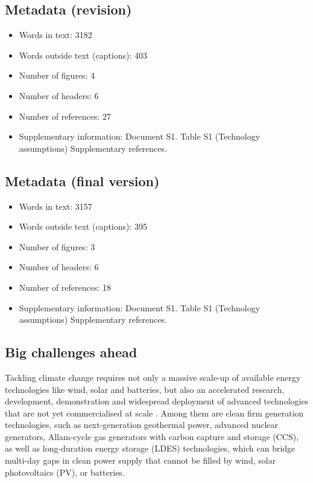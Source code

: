 \documentclass[pdflatex,sn-basic, Numbered]{sn-jnl}
\theoremstyle{thmstyleone}%
\theoremstyle{thmstyletwo}%
\theoremstyle{thmstylethree}%
\begin{document}
\subsection*{Metadata (revision)}
\begin{itemize}
    \item Words in text: 3182
    \item Words outside text (captions): 403
    \item Number of figures: 4
    \item Number of headers: 6
    \item Number of references: 27
    \item Supplementary information: Document S1. Table S1 (Technology assumptions) Supplementary references.
\end{itemize}

\subsection*{Metadata (final version)}
\begin{itemize}
    \item Words in text: 3157
    \item Words outside text (captions): 395
    \item Number of figures: 3
    \item Number of headers: 6
    \item Number of references: 18
    \item Supplementary information: Document S1. Table S1 (Technology assumptions) Supplementary references.
\end{itemize}



\maketitle

\subsection*{Big challenges ahead}\label{sec1}

Tackling climate change requires not only a massive scale-up of available energy technologies like wind, solar and batteries, but also an accelerated research, development, demonstration and widespread deployment of advanced technologies that are not yet commercialised at scale \cite{sepulvedaRoleFirmLowCarbon2018, brownUltralongdurationEnergyStorage2023}.
Among them are clean firm generation technologies, such as next-generation geothermal power, advanced nuclear generators, Allam-cycle gas generators with carbon capture and storage (CCS), as well as long-duration energy storage (LDES) technologies, which can bridge multi-day gaps in clean power supply that cannot be filled by wind, solar photovoltaics (PV), or batteries.
\end{document}
